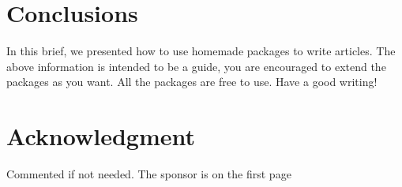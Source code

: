 \documentclass[conference]{IEEEtran}
\begin{document}







\section{Conclusions}\label{sec:conclusions}
In this brief, we presented how to use homemade packages to write articles.
The above information is intended to be a guide, you are encouraged to extend the packages as you want.
All the packages are free to use.
Have a good writing! 


\section*{Acknowledgment}
Commented if not needed. The sponsor is on the first page




\end{document}
